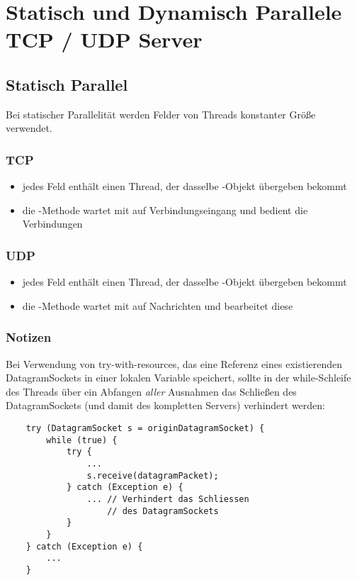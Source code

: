 \section{Statisch und Dynamisch Parallele TCP / UDP Server}

\subsection{Statisch Parallel}

Bei statischer Parallelität werden Felder von Threads konstanter Größe verwendet.
\subsubsection{TCP}

\begin{itemize}
    \item jedes Feld enthält einen Thread, der dasselbe -Objekt übergeben bekommt
    \item die -Methode wartet mit  auf Verbindungseingang und bedient die Verbindungen
\end{itemize}


\subsubsection{UDP}

\begin{itemize}
    \item jedes Feld enthält einen Thread, der dasselbe -Objekt übergeben bekommt
    \item die -Methode wartet mit  auf Nachrichten und bearbeitet diese
\end{itemize}

\subsubsection*{Notizen}
Bei Verwendung von try-with-resources, das eine Referenz eines existierenden DatagramSockets in einer lokalen Variable speichert,
sollte in der while-Schleife des Threads über ein Abfangen \textit{aller} Ausnahmen das Schließen des DatagramSockets (und damit des kompletten Servers)
verhindert werden:

\begin{verbatim}
    try (DatagramSocket s = originDatagramSocket) {
        while (true) {
            try {
                ...
                s.receive(datagramPacket);
            } catch (Exception e) {
                ... // Verhindert das Schliessen
                    // des DatagramSockets
            }
        }
    } catch (Exception e) {
        ...
    }
\end{verbatim}

